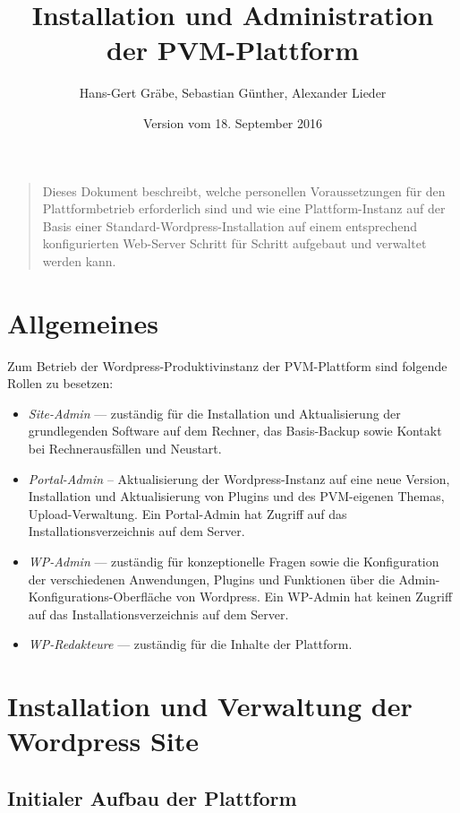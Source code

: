 \documentclass[11pt,a4paper]{article}
\title{Installation und Administration der PVM-Plattform}
\author{Hans-Gert Gräbe, Sebastian Günther, Alexander Lieder}
\date{Version vom 18. September 2016}
\begin{document}
\maketitle
\begin{quote}
Dieses Dokument beschreibt, welche personellen Voraussetzungen für den
Plattformbetrieb erforderlich sind und wie eine Plattform-Instanz auf der Basis
einer Standard-Wordpress-Installation auf einem entsprechend konfigurierten
Web-Server Schritt für Schritt aufgebaut und verwaltet werden kann.
\end{quote}
\tableofcontents{}\newpage{}


\section{Allgemeines}

Zum Betrieb der Wordpress-Produktivinstanz der PVM-Plattform sind folgende
Rollen zu besetzen:
\begin{itemize}
\item \emph{Site-Admin} --- zuständig für die Installation und Aktualisierung
  der grundlegenden Software auf dem Rechner, das Basis-Backup sowie Kontakt
  bei Rechnerausfällen und Neustart.
\item \emph{Portal-Admin} -- Aktualisierung der Wordpress-Instanz auf eine
  neue Version, Installation und Aktualisierung von Plugins und des
  PVM-eigenen Themas, Upload-Verwaltung. Ein Portal-Admin hat Zugriff auf das
  Installationsverzeichnis auf dem Server.
\item \emph{WP-Admin} --- zuständig für konzeptionelle Fragen sowie die
  Konfiguration der verschiedenen Anwendungen, Plugins und Funktionen über die
  Admin-Konfigurations-Oberfläche von Wordpress. Ein WP-Admin hat keinen
  Zugriff auf das Installationsverzeichnis auf dem Server.
\item \emph{WP-Redakteure} --- zuständig für die Inhalte der Plattform. 
\end{itemize}

\section{Installation und Verwaltung der Wordpress Site}

\subsection{Initialer Aufbau der Plattform}
\end{document}
